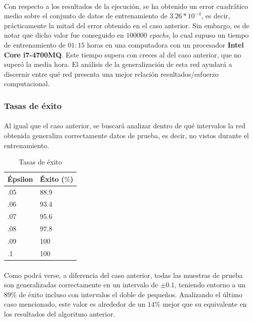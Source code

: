 \documentclass[12pt, twocolumn]{article}
\begin{document}
	\paragraph{} Con respecto a los resultados de la ejecución, se ha obtenido un error cuadrático medio sobre el conjunto de datos de entrenamiento de $3.26*10^{-4}$, es decir, prácticamente la mitad del error obtenido en el caso anterior. Sin embargo, es de notar que dicho valor fue conseguido en $100000$ \textit{epochs}, lo cual supuso un tiempo de entrenamiento de $01:15$ horas en una computadora con un procesador \textbf{Intel Core i7-4700MQ}. Este tiempo supera con creces al del caso anterior, que no superó la media hora. El análisis de la generalización de esta red ayudará a discernir entre qué red presenta una mejor relación resultados/esfuerzo computacional. 
	
	\subsubsection{Tasas de éxito}
	
	\paragraph{} Al igual que el caso anterior, se buscará analizar dentro de qué intervalos la red obtenida generaliza correctamente datos de prueba, es decir, no vistos durante el entrenamiento. 
	
	\begin{table}[H]
		\centering
		\begin{tabular}{ll}
			\hline
			Épsilon & Éxito ($\%$)\\ \hline
			.05     & 88.9  \\
			.06     & 93.4    \\
			.07     & 95.6  \\
			.08     & 97.8  \\
			.09     & 100  \\
			.1      & 100  \\ \hline
		\end{tabular}
		\caption{Tasas de éxito}
		\label{ex2}
	\end{table}
	
	\paragraph{} Como podrá verse, a diferencia del caso anterior, todas las muestras de prueba son generalizadas correctamente en un intervalo de $\pm 0.1$, teniendo entorno a un $89\%$ de éxito incluso con intervalos el doble de pequeños. Analizando el último caso mencionado, este valor es alrededor de un $14\%$ mejor que su equivalente en los resultados del algoritmo anterior. 
	
\end{document}
